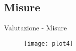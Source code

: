 \subsection{Misure}
\begin{frame}{Valutazione - Misure}
	\begin{figure}
	\texttt{[image: plot4]}
	\end{figure}
	
\end{frame}